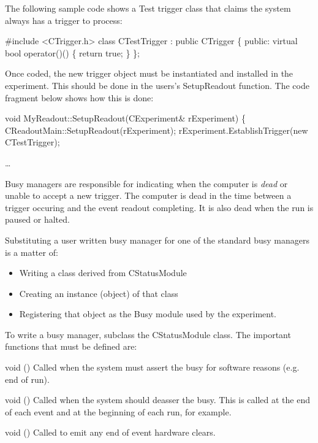       The following sample code shows a Test trigger class
      that claims the system always has a trigger to process:
      \begin{example}
        #include <CTrigger.h>
        class CTestTrigger : public CTrigger
	\{
	  public:
	    virtual bool operator()() \{
	       return true;
	    \}
	\};
      \end{example}
      
      Once coded, the new trigger object must be instantiated
      and installed in the experiment.  This should be done in 
      the users's SetupReadout function.  The code fragment
      below shows how this is done:

   \begin{example}
      void
      MyReadout::SetupReadout(CExperiment\& rExperiment)
      \{
	 CReadoutMain::SetupReadout(rExperiment);
	 rExperiment.EstablishTrigger(new CTestTrigger);
	 
	 \ldots
	 
      \end{example}
        

   
      Busy managers are responsible for indicating when the
      computer is {\em dead} or unable to accept a new trigger.  
      The computer is dead in the time between a trigger
      occuring and the event readout completing.  It is also
      dead when the run is paused or halted.
      
      Substituting a user written busy manager for one of the
      standard busy managers is a matter of:
      \begin{itemize}
	 \item Writing a class derived from CStatusModule
	 \item Creating an instance (object) of that class
	 \item Registering that object as the Busy module
	    used by the experiment.
      \end{itemize}
      
      To write a busy manager, subclass the CStatusModule 
      class.  The important functions that must be defined are:
      \begin{description}
	 \item{void ()}  Called when the
	    system must assert the busy for software reasons
	    (e.g. end of run).
	 \item{void ()} Called when the
	    system should deasser the busy.  This is called
	    at the end of each event and at the beginning of
	    each run, for example.
	 \item{void ()} Called to 
	    emit any end of event hardware clears.
      \end{description}
      
